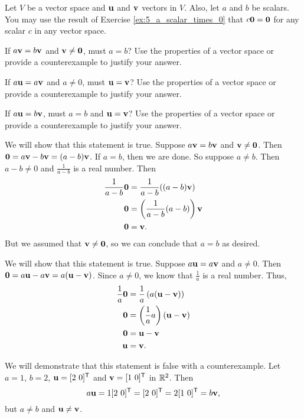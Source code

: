 \begin{example} Let $V$ be a vector space and $\mathbf{u}$ and $\mathbf{v}$ vectors in $V$. Also, let $a$ and $b$ be scalars. You may use the result of Exercise \ref{ex:5_a_scalar_times_0} that $c \mathbf{0} = \mathbf{0}$ for any scalar $c$ in any vector space. 
	\ba
	\item If $a \mathbf{v} = b \mathbf{v}$ and $\mathbf{v} \neq \mathbf{0}$, must $a = b$? Use the properties of a vector space or provide a counterexample to justify your answer. 
	
	\item If $a \mathbf{u} = a \mathbf{v}$ and $a \neq 0$, must $\mathbf{u} = \mathbf{v}$? Use the properties of a vector space or provide a counterexample to justify your answer.

	\item If $a\mathbf{u} = b\mathbf{v}$, must $a = b$ and $\mathbf{u} = \mathbf{v}$? Use the properties of a vector space or provide a counterexample to justify your answer.
	
	\ea

\ExampleSolution
	\ba
	\item We will show that this statement is true. Suppose $a \mathbf{v} = b \mathbf{v}$ and $\mathbf{v} \neq \mathbf{0}$. Then $\mathbf{0} = a \mathbf{v} - b \mathbf{v} = (a-b)\mathbf{v}$. If $a = b$, then we are done. So suppose $a \neq b$. Then $a-b \neq 0$ and $\frac{1}{a-b}$ is a real number. Then \begin{align*}
\frac{1}{a-b} \mathbf{0} &= \frac{1}{a-b}((a-b)\mathbf{v}) \\
\mathbf{0} &= \left(\frac{1}{a-b}(a-b)\right) \mathbf{v} \\
\mathbf{0} &= \mathbf{v}.
\end{align*}
But we assumed that $\mathbf{v} \neq \mathbf{0}$, so we can conclude that $a = b$ as desired. 
	
	\item We will show that this statement is true. Suppose $a \mathbf{u} = a \mathbf{v}$ and $a \neq 0$. Then $\mathbf{0} = a \mathbf{u} - a \mathbf{v} = a(\mathbf{u} - \mathbf{v})$. Since $a \neq 0$, we know that $\frac{1}{a}$ is a real number. Thus,
\begin{align*}
\frac{1}{a} \mathbf{0} &= \frac{1}{a} \left(a (\mathbf{u} - \mathbf{v})\right) \\ 
\mathbf{0} &= \left( \frac{1}{a}a\right) (\mathbf{u} - \mathbf{v}) \\
\mathbf{0} &= \mathbf{u} - \mathbf{v} \\
\mathbf{u} &= \mathbf{v}.
\end{align*}

	\item We will demonstrate that this statement is false with a counterexample. Let $a = 1$, $b = 2$, $\mathbf{u} = [2 \ 0]^{\mathsf{T}}$ and $\mathbf{v} = [1 \ 0]^{\mathsf{T}}$ in $\mathbb{R}^2$. Then 
	\[a \mathbf{u} = 1[2 \ 0]^{\mathsf{T}} = [2 \ 0]^{\mathsf{T}} = 2[1 \ 0]^{\mathsf{T}} = b \mathbf{v},\]
	but $a \neq b$ and $\mathbf{u} \neq \mathbf{v}$.  

	
	\ea
	
\end{example}


